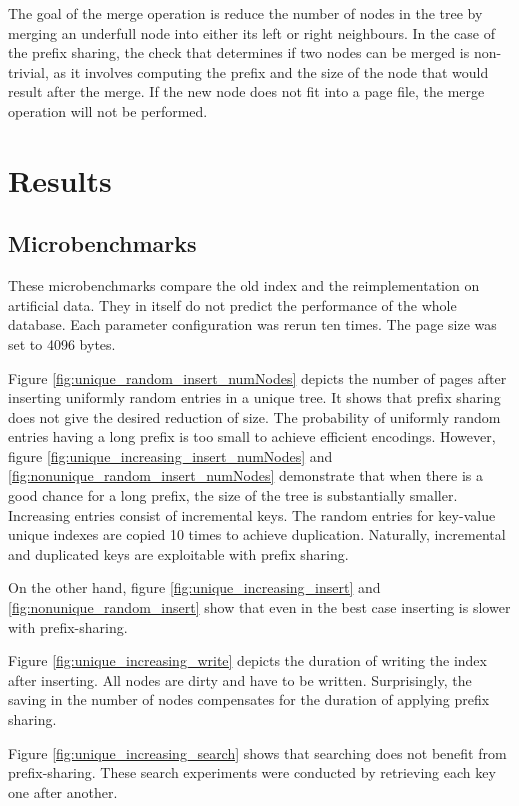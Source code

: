 \documentclass[11pt,a4paper,oneside]{article}
\begin{document}
The goal of the merge operation is reduce the number of nodes in the tree by merging an underfull node into either its left or right neighbours. In the case of the prefix sharing, the check that determines if two nodes can be merged is non-trivial, as it involves computing the prefix and the size of the node that would result after the merge. If the new node does not fit into a page file, the merge operation will not be performed.


\section{Results}
\subsection{Microbenchmarks} %
\label{sub:microbenchmarks}
These microbenchmarks compare the old index and the reimplementation on artificial data. 
They in itself do not predict the performance of the whole database.
Each parameter configuration was rerun ten times. 
The page size was set to 4096 bytes.

Figure \ref{fig:unique_random_insert_numNodes} depicts the number of pages after inserting uniformly random entries in a unique tree.
It shows that prefix sharing does not give the desired reduction of size.
The probability of uniformly random entries having a long prefix is too small to achieve efficient encodings.
However, figure \ref{fig:unique_increasing_insert_numNodes} and \ref{fig:nonunique_random_insert_numNodes} demonstrate 
that when there is a good chance for a long prefix, the size of the tree is substantially smaller.
Increasing entries consist of incremental keys. The random entries for key-value unique indexes are copied 10 times to achieve duplication.
Naturally, incremental and duplicated keys are exploitable with prefix sharing.

On the other hand, figure \ref{fig:unique_increasing_insert} and \ref{fig:nonunique_random_insert} show that even in the best case inserting is slower with prefix-sharing.

Figure \ref{fig:unique_increasing_write} depicts the duration of writing the index after inserting. 
All nodes are dirty and have to be written.
Surprisingly, the saving in the number of nodes compensates for the duration of applying prefix sharing.

Figure \ref{fig:unique_increasing_search} shows that searching does not benefit from prefix-sharing. These search experiments were conducted by retrieving each key one after another.
\end{document}
